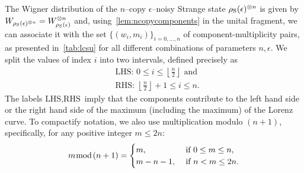 \documentclass[pra,
aps,
twocolumn,
superscriptaddress,
groupedaddress,
nofootinbib,
reprint
]{revtex4-1}
\begin{document}
The Wigner distribution of the $n$--copy $\epsilon$--noisy Strange state $\rho_{\rm{S}}(\epsilon)^{\otimes n}$ is given by $\W{\rho_{\rm{S}}(\epsilon)^{\otimes n}} = W_{\rho_{\rm{S}}(\epsilon)}^{\otimes n}$ and, using~\cref{lem:ncopycomponents} in the unital fragment, we can associate it with the set $\{(w_i, m_i)\}_{i=0,\dots,n}$ of component-multiplicity pairs, as presented in~\cref{tab:lcsu} for all different combinations of parameters $n,\epsilon$.
We split the values of index $i$ into two intervals, defined precisely as
\begin{align}
&\text{LHS: } 0 \leq i \leq \left\lfloor \frac{n}{2} \right\rfloor \text{ and} \\
&\text{RHS: } \left\lfloor \frac{n}{2} \right\rfloor +1 \leq i \leq n.
\end{align}
The labels $\text{LHS}, \text{RHS}$ imply that the components contribute to the left hand side or the right hand side of the maximum (including the maximum) of the Lorenz curve.
To compactify notation, we also use multiplication modulo $(n+1)$, specifically, for any positive integer $m \leq 2n$:
\begin{equation}
	m \hspace{-6pt}\mod{\hspace{-2pt}(n+1)} = 
	\begin{cases}
		m,\ &\text{if } 0 \leq m \leq n, \\
		m - n - 1,\ &\text{if } n < m \leq 2n.
	\end{cases}
\end{equation}
\end{document}
